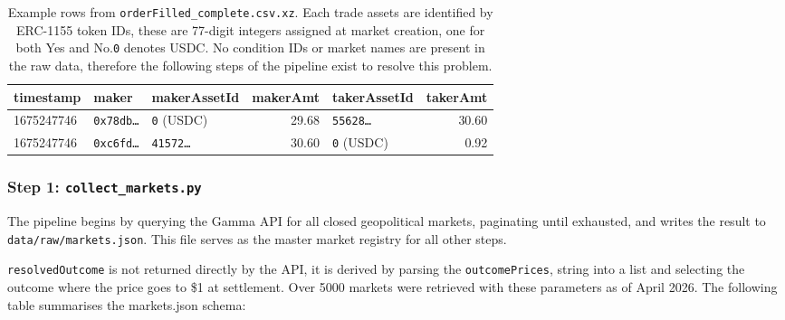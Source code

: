 \documentclass[11pt,a4paper]{article}
\begin{document}
\begin{table}[H]
\centering
\caption{Example rows from \texttt{orderFilled\_complete.csv.xz}.
         Each trade assets are identified by ERC-1155 token IDs, these are
         77-digit integers assigned at market creation, one for both Yes and No.\texttt{0} denotes USDC. 
         No condition IDs or market names are present in
         the raw data, therefore the following steps of the pipeline exist to resolve this problem.}
\label{tab:raw_snapshot}
\small
\begin{tabularx}{\textwidth}{l l l r l r}
\toprule
\textbf{timestamp} & \textbf{maker} & \textbf{makerAssetId}
    & \textbf{makerAmt} & \textbf{takerAssetId} & \textbf{takerAmt} \\
\midrule
1675247746 & \texttt{0x78db{\ldots}} & \texttt{0} (USDC)
    & 29.68 & \texttt{55628{\ldots}} & 30.60 \\
1675247746 & \texttt{0xc6fd{\ldots}} & \texttt{41572{\ldots}}
    & 30.60 & \texttt{0} (USDC) & 0.92 \\
\bottomrule
\end{tabularx}
\end{table}


\subsubsection*{Step 1: \texttt{collect\_markets.py}}
The pipeline begins by querying the Gamma API for all closed geopolitical markets, paginating until exhausted, and writes the result to \texttt{data/raw/markets.json}.
This file serves as the master market registry for all other steps.


\texttt{resolvedOutcome} is not returned directly by the API, it is 
derived by parsing the \texttt{outcomePrices}, string into a list and 
selecting the outcome where the price goes to \$1 at settlement. Over 5000 markets were retrieved with these parameters as of April 2026. The following table summarises the markets.json schema:
\end{document}

